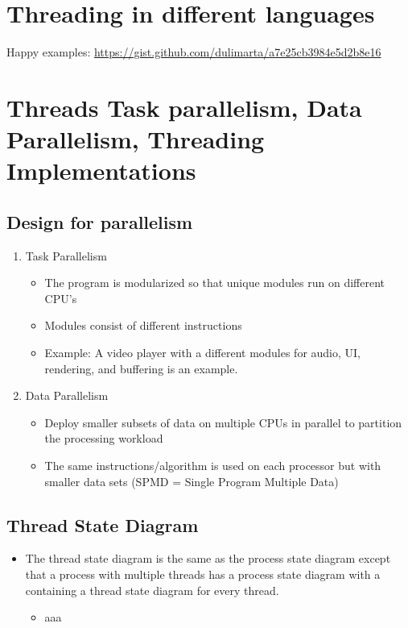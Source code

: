 \documentclass[11pt]{article}
\begin{document}
\section*{Threading in different languages}
Happy examples: \url{https://gist.github.com/dulimarta/a7e25cb3984e5d2b8e16}


\section*{Threads Task parallelism, Data Parallelism, Threading Implementations}

\subsection*{Design for parallelism}
\begin{enumerate}
  \item Task Parallelism
  \begin{itemize}
    \item The program is modularized so that unique modules run on different CPU's
	\item Modules consist of different instructions
	\item Example: A video player with a different modules for audio, UI,
	        rendering, and buffering is an example.
  \end{itemize}
  \item Data Parallelism
	 \begin{itemize}
	   \item Deploy smaller subsets of data on multiple CPUs in parallel to
	        partition the processing workload
	   \item The same instructions/algorithm is used on each processor but
	        with smaller data sets (SPMD = Single Program Multiple Data)
	  \end{itemize}
\end{enumerate}


\subsection*{ Thread State Diagram}
	  \begin{itemize}
	  \item The thread state diagram is the same as the process state diagram except that a process with multiple threads has a process state diagram with a containing a thread state diagram for every thread.
	    \begin{itemize}
	        \item aaa
	    \end{itemize}
	  \end{itemize}
\end{document}
